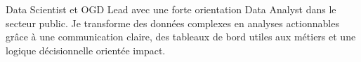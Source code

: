
\begin{cvparagraph}
Data Scientist et OGD Lead avec une forte orientation Data Analyst dans le secteur public. Je transforme des données complexes en analyses actionnables grâce à une communication claire, des tableaux de bord utiles aux métiers et une logique décisionnelle orientée impact.
\end{cvparagraph}
